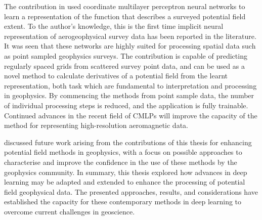 The contribution in  used coordinate multilayer perceptron neural networks to learn a representation of the function that describes a surveyed potential field extent.
To the author's knowledge, this is the first time implicit neural representation of aerogeophysical survey data has been reported in the literature.
It was seen that these networks are highly suited for processing spatial data such as point sampled geophysics surveys.
The contribution is capable of predicting regularly spaced grids from scattered survey point data, and can be used as a novel method to calculate derivatives of a potential field from the learnt representation, both task which are fundamental to interpretation and processing in geophysics.
By commencing the methods from point sample data, the number of individual processing steps is reduced, and the application is fully trainable.
Continued advances in the recent field of CMLPs will improve the capacity of the method for representing high-resolution aeromagnetic data.


 discussed future work arising from the contributions of this thesis for enhancing potential field methods in geophysics, with a focus on possible approaches to characterise and improve the confidence in the use of  these methods by the geophysics community.
In summary, this thesis explored how advances in deep learning may be adapted and extended to enhance the processing of potential field geophysical data.
The presented approaches, results, and considerations have established the capacity for these contemporary methods in deep learning to overcome current challenges in geoscience.

% 